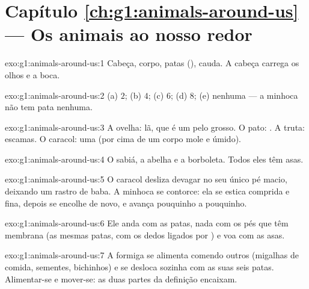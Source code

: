 \section*{Capítulo \ref{ch:g1:animals-around-us} --- Os animais ao nosso redor}

\begin{solution}{exo:g1:animals-around-us:1}
Cabeça, corpo, patas (), cauda. A cabeça carrega os olhos e a
boca.
\end{solution}

\begin{solution}{exo:g1:animals-around-us:2}
(a) $2$; (b) $4$; (c) $6$; (d) $8$; (e) nenhuma --- a minhoca não
tem pata nenhuma.
\end{solution}

\begin{solution}{exo:g1:animals-around-us:3}
A ovelha: lã, que é um pelo grosso. O pato: . A truta: escamas.
O caracol: uma  (por cima de um corpo mole e úmido).
\end{solution}

\begin{solution}{exo:g1:animals-around-us:4}
O sabiá, a abelha e a borboleta. Todos eles têm asas.
\end{solution}

\begin{solution}{exo:g1:animals-around-us:5}
O caracol desliza devagar no seu único pé macio, deixando um rastro
de baba. A minhoca se contorce: ela se estica comprida e fina,
depois se encolhe de novo, e avança pouquinho a pouquinho.
\end{solution}

\begin{solution}{exo:g1:animals-around-us:6}
Ele anda com as patas, nada com os pés que têm membrana (as mesmas
patas, com os dedos ligados por ) e voa com as asas.
\end{solution}

\begin{solution}{exo:g1:animals-around-us:7}
A formiga se alimenta comendo outros  (migalhas de
comida, sementes, bichinhos) e se desloca sozinha com as suas seis
patas. Alimentar-se e mover-se: as duas partes da definição encaixam.
\end{solution}

